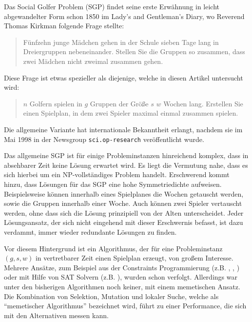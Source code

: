 Das Social Golfer Problem (SGP) findet seine erste Erwähnung in leicht abgewandelter Form schon 1850 im Lady's and Gentleman's Diary, wo Reverend Thomas Kirkman folgende Frage stellte:

\begin{quote}
Fünfzehn junge Mädchen gehen in der Schule sieben Tage lang in Dreiergruppen nebeneinander. Stellen Sie die Gruppen so zusammen, dass zwei Mädchen nicht zweimal zusammen gehen.
\end{quote}
Diese Frage ist etwas spezieller als diejenige, welche in diesen Artikel untersucht wird:
\begin{quote}
$n$ Golfern spielen in $g$ Gruppen der Größe $s$ $w$ Wochen lang. Erstellen Sie einen Spielplan, in dem zwei Spieler maximal einmal zusammen spielen.
\end{quote}
Die allgemeine Variante hat internationale Bekanntheit erlangt, nachdem sie im Mai 1998 in der Newsgroup \texttt{sci.op-research} veröffentlicht wurde.

Das allgemeine SGP ist für einige Probleminstanzen hinreichend komplex, dass in absehbarer Zeit keine Lösung erwartet wird. Es liegt die Vermutung nahe, dass es sich hierbei um ein NP-vollständiges Problem handelt.
Erschwerend kommt hinzu, dass Lösungen für das SGP eine hohe Symmetriedichte aufweisen. 
Beispielsweise können innerhalb eines Spielplanes die Wochen getauscht werden, sowie die Gruppen innerhalb einer Woche. 
Auch können zwei Spieler vertauscht werden, ohne dass sich die Lösung prinzipiell von der Alten unterscheidet. 
Jeder Lösungsansatz, der sich nicht eingehend mit dieser Erschwernis befasst, ist dazu verdammt, immer wieder redundante Lösungen zu finden.

Vor diesem Hintergrund ist ein Algorithmus, der für eine Probleminstanz $(g,s,w)$ in vertretbarer Zeit einen Spielplan erzeugt, von großem Interesse.
Mehrere Ansätze, zum Beispiel aus der Constraints Programmierung (z.B. \cite{fahle01}, \cite{smith01}, \cite{sellmann02}) oder mit Hilfe von SAT Solvern (z.B. \cite{triska08}), 
wurden schon verfolgt. Allerdings war unter den bisherigen Algorithmen noch keiner, mit einem memetischen Ansatz.
Die Kombination von Selektion, Mutation und lokaler Suche, welche als \enquote{memetischer Algorithmus} bezeichnet wird, führt zu einer Performance, die sich mit den Alternativen messen kann.


